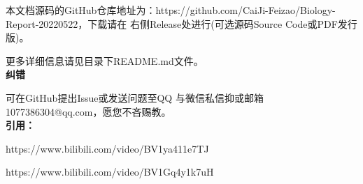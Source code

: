 \documentclass[UTF8,a4paper,11 pt]{ctexart}%
\begin{document}
	本文档源码的GitHub仓库地址为：https://github.com/CaiJi-Feizao/Biology-Report-20220522，下载请在
	右侧Release处进行(可选源码Source Code或PDF发行版)。

	更多详细信息请见目录下README.md文件。
	\\\textbf{纠错}
	
	可在GitHub提出Issue或发送问题至QQ
	与微信私信抑或邮箱1077386304@qq.com，愿您不吝赐教。
	\\\textbf{引用：}

	https://www.bilibili.com/video/BV1ya411e7TJ

	https://www.bilibili.com/video/BV1Gq4y1k7uH
\end{document}
